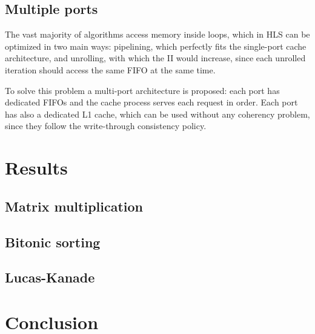 \documentclass[11pt,a4paper]{memoir}
\begin{document}
\section{Multiple ports}
The vast majority of algorithms access memory inside loops, which in HLS can be
optimized in two main ways: pipelining, which perfectly fits the single-port
cache architecture, and unrolling, with which the II would increase, since each
unrolled iteration should access the same FIFO at the same time.

To solve this problem a multi-port architecture is proposed: each port has
dedicated FIFOs and the cache process serves each request in order.
Each port has also a dedicated L1 cache, which can be used without any
coherency problem, since they follow the write-through consistency policy.


\chapter{Results}
\section{Matrix multiplication}
\section{Bitonic sorting}
\section{Lucas-Kanade}

\chapter{Conclusion}

\printbibliography
\end{document}
